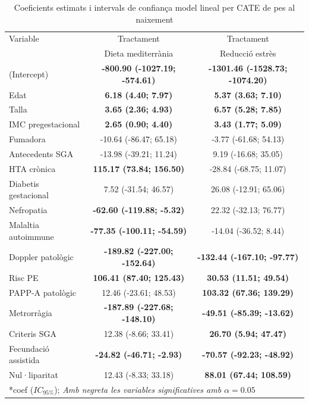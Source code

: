 \documentclass[../main.tex]{subfiles}
\begin{document}
    \begin{table}[H]
        \centering
        \captionsetup{font=small}
        \caption{Coeficients estimats i intervals de confiança model lineal per CATE de pes al naixement}
        \label{tab:coef_pesRN}
        \centering
        \scriptsize
        \begin{tabular}[t]{p{4cm} c @{\hspace{1cm}} c}
        \toprule
        Variable & Tractament  & Tractament \\
         & Dieta mediterrània & Reducció estrès \\
        \midrule
        (Intercept) & \textbf{-800.90 (-1027.19; -574.61)} & \textbf{-1301.46 (-1528.73; -1074.20)}\\
        Edat & \textbf{6.18 (4.40; 7.97)} & \textbf{5.37 (3.63; 7.10)}\\
        Talla & \textbf{3.65 (2.36; 4.93)} & \textbf{6.57 (5.28; 7.85)}\\
        IMC pregestacional & \textbf{2.65 (0.90; 4.40)} & \textbf{3.43 (1.77; 5.09)}\\
        Fumadora & -10.64 (-86.47; 65.18) & -3.77 (-61.68; 54.13)\\
        \addlinespace
        Antecedents SGA & -13.98 (-39.21; 11.24) & 9.19 (-16.68; 35.05)\\
        HTA crònica & \textbf{115.17 (73.84; 156.50)} & -28.84 (-68.75; 11.07)\\
        Diabetis gestacional & 7.52 (-31.54; 46.57) & 26.08 (-12.91; 65.06)\\
        Nefropatia & \textbf{-62.60 (-119.88; -5.32)} & 22.32 (-32.13; 76.77)\\
        Malaltia autoimmune & \textbf{-77.35 (-100.11; -54.59)} & -14.04 (-36.52; 8.44)\\
        \addlinespace
        Doppler patològic & \textbf{-189.82 (-227.00; -152.64)} & \textbf{-132.44 (-167.10; -97.77)}\\
        Risc PE & \textbf{106.41 (87.40; 125.43)} & \textbf{30.53 (11.51; 49.54)}\\
        PAPP-A patològic & 12.46 (-23.61; 48.53) & \textbf{103.32 (67.36; 139.29)}\\
        Metrorràgia & \textbf{-187.89 (-227.68; -148.10)} & \textbf{-49.51 (-85.39; -13.62)}\\
        Criteris SGA & 12.38 (-8.66; 33.41) & \textbf{26.70 (5.94; 47.47)}\\
        \addlinespace
        Fecundació assistida & \textbf{-24.82 (-46.71; -2.93)} & \textbf{-70.57 (-92.23; -48.92)}\\
        Nul·liparitat & 12.43 (-8.33; 33.18) & \textbf{88.01 (67.44; 108.59)}\\
        \bottomrule
        \multicolumn{3}{l}{\rule{0pt}{1em} *coef ($IC_{95\%}$); \textit{Amb negreta les variables significatives amb $\alpha=0.05$}}
        \end{tabular}
    \end{table}
\end{document}
